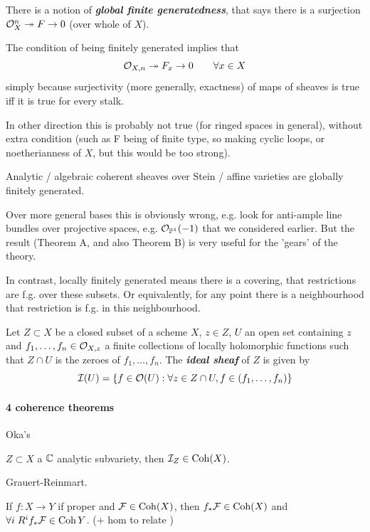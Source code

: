 \begin{defn}
	There is a notion of \textbf{\textit{global finite generatedness}}, that says there is a surjection $\mathcal{O}_X^n \twoheadrightarrow F \to 0$ (over whole of $X$).
\end{defn}
\begin{remark}
	The condition of being finitely generated implies that
	\[\mathcal{O}_{X,n}\twoheadrightarrow F_x\to 0\qquad\forall x\in X\]
	simply because surjectivity (more generally, exactness) of maps of sheaves is true iff it is true for every stalk.
	
	In other direction this is probably not true (for ringed spaces in general), without extra condition (such as F being of finite type, so making cyclic loops, or noetherianness of $X$, but this would be too strong).
\end{remark}
\begin{thm}
	Analytic / algebraic coherent sheaves over Stein / affine varieties are globally finitely generated.
\end{thm}

Over more general bases this is obviously wrong, e.g. look for anti-ample line bundles over projective spaces, e.g. $\mathcal{O}_{\mathbb{P}^1}(-1)$ that we considered earlier. But the result (Theorem A, and also Theorem B) is very useful for the 'gears' of the theory.

In contrast, locally finitely generated means there is a covering, that restrictions are f.g. over these subsets. Or equivalently, for any point there is a neighbourhood that restriction is f.g. in this neighbourhood.

\begin{defn}
	Let $Z\subset X$ be a closed subset of a scheme $X$, $z\in Z$, $U$ an open set containing $z$ and $f_1,\ldots,f_n\in\mathcal{O}_{X,z}$ a finite collections of locally holomorphic functions such that $Z\cap U$ is the zeroes of $f_1,\ldots,f_n$. The \textbf{\textit{ideal sheaf}} of $Z$ is given by
	\[\mathcal{I}(U)=\{f\in\mathcal{O}(U):\forall z\in Z\cap U, f\in(f_1,\ldots,f_n)\}\]
\end{defn}
\paragraph{4 coherence theorems}
\begin{thm}
	Oka's
\end{thm}
\begin{thm}
	$Z\subset X$ a $\mathbb{C}$ analytic subvariety, then $\mathcal{I}_Z\in \operatorname{Coh}(X)$.
\end{thm}
\begin{thm}
	Grauert-Reinmart.
\end{thm}
\begin{thm}
	If $f:X\to Y$ if proper and $\mathcal{F}\in\operatorname{Coh}(X)$, then $f_*\mathcal{F}\in\operatorname{Coh}(X)$ and $\forall i \;R^i f_*\mathcal{F}\in\operatorname{Coh} Y$. (+ hom to relate )
\end{thm}

